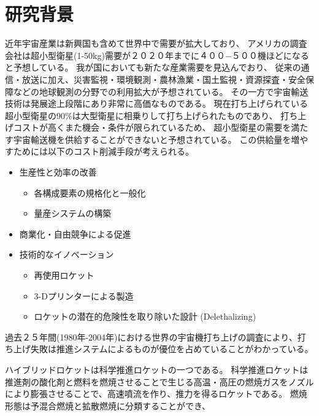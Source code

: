 \section{研究背景}
%
%
近年宇宙産業は新興国も含めて世界中で需要が拡大しており、
アメリカの調査会社は超小型衛星(1-50kg)需要が２０２０年までに４００−５００機ほどになると予想している。\cite{nano/micro}
我が国においても新たな産業需要を見込んでおり、
従来の通信・放送に加え、災害監視・環境観測・農林漁業・国土監視・資源探査・安全保障などの地球観測の分野での利用拡大が予想されている。
その一方で宇宙輸送技術は発展途上段階にあり非常に高価なものである。
現在打ち上げられている超小型衛星の90\%は大型衛星に相乗りして打ち上げられたものであり、
打ち上げコストが高くまた機会・条件が限られているため、
超小型衛星の需要を満たす宇宙輸送機を供給することができないと予想されている。
この供給量を増やすためには以下のコスト削減手段が考えられる。
\begin{itemize}
	\item 生産性と効率の改善
	\begin{itemize}
		\item 各構成要素の規格化と一般化
		\item 量産システムの構築
	\end{itemize}
	\item 商業化・自由競争による促進
	\item 技術的なイノベーション
	\begin{itemize}
		\item 再使用ロケット
		\item 3-Dプリンターによる製造
		\item ロケットの潜在的危険性を取り除いた設計 (Delethalizing)
	\end{itemize}
\end{itemize}
過去２５年間(1980年-2004年)における世界の宇宙機打ち上げの調査により、打ち上げ失敗は推進システムによるものが優位を占めていることがわかっている。\cite{failure}

ハイブリッドロケットは科学推進ロケットの一つである。
科学推進ロケットは推進剤の酸化剤と燃料を燃焼させることで生じる高温・高圧の燃焼ガスをノズルにより膨張させることで、高速噴流を作り、推力を得るロケットである。
燃焼形態は予混合燃焼と拡散燃焼に分類することができ、
